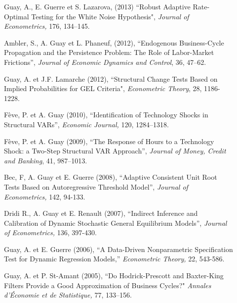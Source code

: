 \begin{description}
\item[] Guay, A., E. Guerre et S. Lazarova, (2013) ``Robust Adaptive Rate-Optimal Testing for the White Noise  
Hypothesis", {\it Journal of Econometrics,} 176, 134--145.

\item[] Ambler, S., A. Guay et L. Phaneuf, (2012), ``Endogenous Business-Cycle Propagation and the Persistence Problem: The Role of Labor-Market Frictions'',   {\it Journal of Economic Dynamics and Control}, 36, 47--62.

\item[] Guay, A. et J.F. Lamarche (2012), ``Structural Change Tests Based on 
Implied Probabilities for GEL Criteria",  {\it Econometric Theory}, 28, 1186-1228.

\item[]  F\`eve, P. et A. Guay (2010), ``Identification of Technology Shocks in Structural VARs'',
{\it Economic Journal,} 120, 1284--1318.


\item[] F\`eve, P. et A. Guay (2009), ``The Response of Hours to a Technology Shock: a Two-Step 
Structural VAR Approach'', 
{\it Journal of Money, Credit and Banking}, 41, 987--1013.



\item[] Bec, F,  A. Guay et E. Guerre (2008), ``Adaptive Consistent
Unit Root Tests Based on Autoregressive Threshold Model'', {\it
Journal of Econometrics,} 142,
94-133.



\item[] Dridi R., A. Guay et E. Renault (2007), ``Indirect Inference and
Calibration of Dynamic Stochastic General Equilibrium Models'', {\it
Journal of Econometrics,} 136, 397-430.


\item[] Guay, A. et E. Guerre (2006), ``A Data-Driven Nonparametric
Specification Test for Dynamic Regression Models,'' {\it Econometric
Theory,} 22, 543-586.


\item[] Guay, A. et P. St-Amant (2005), ``Do Hodrick-Prescott and Baxter-King Filters
Provide a Good Approximation of Business Cycles?" {\it Annales
d'\'Economie et de Statistique,} 77, 133--156.



\end{description}

